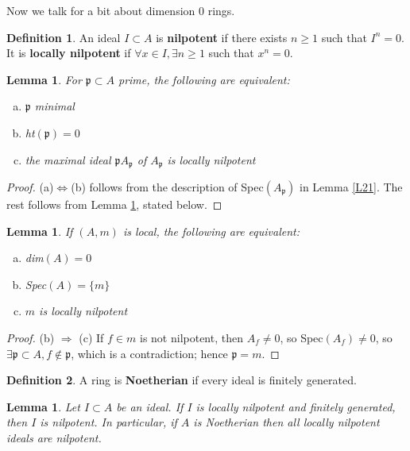 \documentclass{article}
\newcommand{\fr}{\mathfrak}
\theoremstyle{plain}
\newtheorem{lem}[thm]{Lemma}
\theoremstyle{definition}
\newtheorem{defn}{Definition}
\theoremstyle{remark}
\begin{document}
Now we talk for a bit about dimension 0 rings.

\begin{defn}
An ideal $I\subset A$ is \textbf{nilpotent} if there exists $n\geq 1$ such that $I^n = 0$. It is \textbf{locally nilpotent} if $\forall x\in I, \exists n\geq 1$ such that $x^n=0$.
\end{defn}

\begin{lem}
\label{L30}
For $\fr p \subset A$ prime, the following are equivalent:
\begin{enumerate} [(a)]
\item $\fr p$ minimal
\item ht$(\fr p) = 0$
\item the maximal ideal $\fr pA_{\fr p}$ of $A_{\fr p}$ is locally nilpotent
\end{enumerate}
\end{lem}

\begin{proof}
(a)$\Leftrightarrow $(b) follows from the description of Spec$(A_{\fr p})$ in Lemma \ref{L21}. The rest follows from Lemma \ref{L31}, stated below.
\end{proof}

\begin{lem}
\label{L31}
If $(A, m)$ is local, the following are equivalent:
\begin{enumerate} [(a)]
\item dim$(A) = 0$
\item Spec$(A) = \{m\}$
\item $m$ is locally nilpotent
\end{enumerate}
\end{lem}

\begin{proof}
(b) $\Rightarrow$ (c) If $f\in m$ is not nilpotent, then $A_f \neq 0$, so Spec$(A_f) \neq 0$, so $\exists \fr p\subset A, f \not \in \fr p$, which is a contradiction; hence $\fr p = m$.
\end{proof}


\begin{defn}
A ring is \textbf{Noetherian} if every ideal is finitely generated.
\end{defn}

\begin{lem}
\label{L32}
Let $I\subset A$ be an ideal. If $I$ is locally nilpotent and finitely generated, then $I$ is nilpotent. In particular, if $A$ is Noetherian then all locally nilpotent ideals are nilpotent.
\end{lem}
\end{document}
